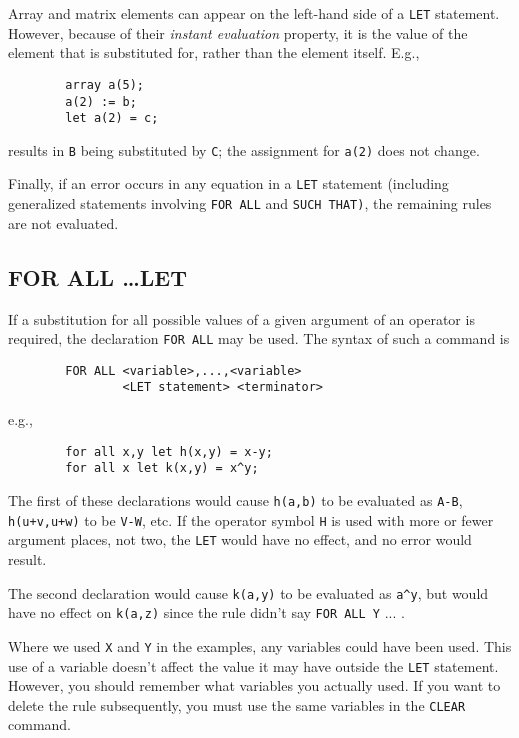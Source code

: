 Array and matrix elements can appear on the left-hand side of a {\tt LET}
statement. However, because of their {\em instant evaluation\/}
 property, it is the value of the element that
is substituted for, rather than the element itself.  E.g.,
\begin{verbatim}
        array a(5);
        a(2) := b;
        let a(2) = c;
\end{verbatim}
results in {\tt B} being substituted by {\tt C}; the assignment for
{\tt a(2)} does not change.

Finally, if an error occurs in any equation in a {\tt LET} statement
(including generalized statements involving {\tt FOR ALL} and {\tt SUCH
THAT)}, the remaining rules are not evaluated.

\subsection{FOR ALL \ldots LET}
If a substitution for all possible values of a given argument of an
operator is required, the declaration {\tt FOR ALL} may be used. The
syntax of such a command is
\begin{verbatim}
        FOR ALL <variable>,...,<variable>
                <LET statement> <terminator>
\end{verbatim}
e.g.,
\begin{verbatim}
        for all x,y let h(x,y) = x-y;
        for all x let k(x,y) = x^y;
\end{verbatim}
The first of these declarations would cause {\tt h(a,b)} to be evaluated
as {\tt A-B}, {\tt h(u+v,u+w)} to be {\tt V-W}, etc.  If the operator
symbol {\tt H} is used with more or fewer argument places, not two, the
{\tt LET} would have no effect, and no error would result.

The second declaration would cause {\tt k(a,y)} to be evaluated as
{\tt a\verb|^|y}, but would have no effect on {\tt k(a,z)} since the rule
didn't say {\tt FOR ALL Y} ... .

Where we used {\tt X} and {\tt Y} in the examples, any variables could
have been used.  This use of a variable doesn't affect the value it may
have outside the {\tt LET} statement.  However, you should remember what
variables you actually used.  If you want to delete the rule subsequently,
you must use the same variables in the {\tt CLEAR} command.

